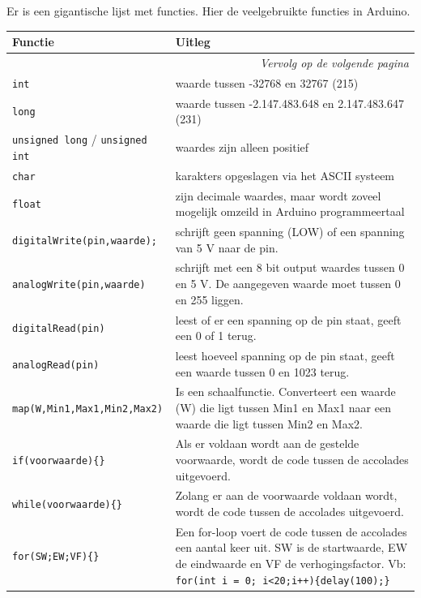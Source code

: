 \documentclass{arduino}
\begin{document}
\begin{minipage}{\widemargin}
Er is een gigantische lijst met functies. Hier de veelgebruikte functies in Arduino.

\begin{longtable}{p{}p{}}
\toprule
\textbf{Functie} & \textbf{Uitleg} \\
\midrule\endhead
\midrule \multicolumn{2}{r}{{\scriptsize\textit{Vervolg op de volgende pagina}}} \\ \bottomrule
\endfoot
\bottomrule
\endlastfoot 
{\lstinline[]!int!} &
waarde tussen -32768 en 32767 (215) \\
{\lstinline[]!long!} &
waarde tussen -2.147.483.648 en 2.147.483.647 (231) \\
{\lstinline[]!unsigned long!} / {\lstinline[]!unsigned int!} &
waardes zijn alleen positief \\
{\lstinline[]!char!} &
karakters opgeslagen via het ASCII systeem \\
{\lstinline[]!float!} &
zijn decimale waardes, maar wordt zoveel mogelijk omzeild in Arduino programmeertaal \\
{\lstinline[]!digitalWrite(pin,waarde);!} &
schrijft geen spanning (LOW) of een spanning van 5 V naar de pin. \\
{\lstinline[]!analogWrite(pin,waarde)!} &
schrijft met een 8 bit output waardes tussen 0 en 5 V. De aangegeven waarde moet tussen 0 en 255 liggen. \\
{\lstinline[]!digitalRead(pin)!} &
leest of er een spanning op de pin staat, geeft een 0 of 1 terug. \\
{\lstinline[]!analogRead(pin)!} &
leest hoeveel spanning op de pin staat, geeft een waarde tussen 0 en 1023 terug. \\
{\lstinline[]!map(W,Min1,Max1,Min2,Max2)!} &
Is een schaalfunctie. Converteert een waarde (W) die ligt tussen Min1 en Max1 naar een waarde die ligt tussen Min2 en Max2. \\
{\lstinline[]!if(voorwaarde){}!} &
Als er voldaan wordt aan de gestelde voorwaarde, wordt de code tussen de accolades uitgevoerd. \\
{\lstinline[]!while(voorwaarde){}!} &
Zolang er aan de voorwaarde voldaan wordt, wordt de code tussen de accolades uitgevoerd. \\
{\lstinline[]!for(SW;EW;VF){}!} &
Een for-loop voert de code tussen de accolades een aantal keer uit. SW is de startwaarde, EW de eindwaarde en VF de verhogingsfactor. Vb: {\lstinline[]!for(int i = 0; i<20;i++){delay(100);}!} \\

\end{longtable}
\end{minipage}
\end{document}
